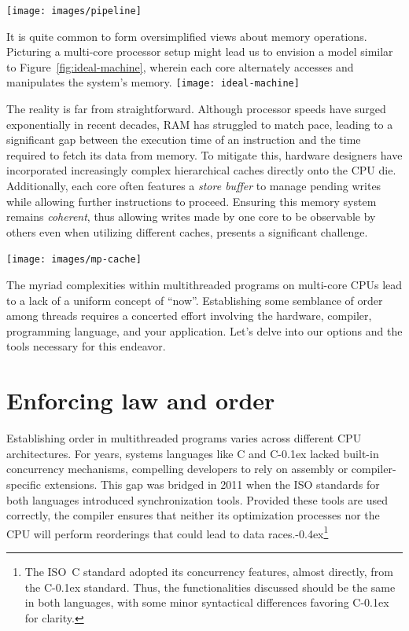 \documentclass[fontsize=10pt, oneside]{scrartcl}
\newcommand{\punckern}{\kern-0.4ex}
\newcommand{\cplusplus}[1]{C\kern-0.1ex\raisebox{0.15ex}{\texttt{++}}}
\newcommand{\clang}[1]{C}
\newcommand{\fig}[1]{Figure~\ref{#1}}
\newcommand{\introduce}[1]{\textit{#1}}
\begin{document}
\texttt{[image: images/pipeline]}
\label{fig:pipeline}

It is quite common to form oversimplified views about memory operations.
Picturing a multi-core processor setup might lead us to envision a model similar to \fig{fig:ideal-machine},
wherein each core alternately accesses and manipulates the system's memory.
\texttt{[image: ideal-machine]}
\label{fig:ideal-machine}

The reality is far from straightforward.
Although processor speeds have surged exponentially in recent decades,
\textsc{RAM} has struggled to match pace,
leading to a significant gap between the execution time of an instruction and the time required to fetch its data from memory.
To mitigate this, hardware designers have incorporated increasingly complex hierarchical caches directly onto the \textsc{CPU} die.
Additionally, each core often features a \introduce{store buffer} to manage pending writes while allowing further instructions to proceed.
Ensuring this memory system remains \introduce{coherent},
thus allowing writes made by one core to be observable by others even when utilizing different caches,
presents a significant challenge.

\texttt{[image: images/mp-cache]}
\label{fig:dunnington}

The myriad complexities within multithreaded programs on multi-core \textsc{CPU}s lead to a lack of a uniform concept of ``now''.
Establishing some semblance of order among threads requires a concerted effort involving the hardware,
compiler, programming language, and your application.
Let's delve into our options and the tools necessary for this endeavor.

\section{Enforcing law and order}
\label{seqcst}

Establishing order in multithreaded programs varies across different \textsc{CPU} architectures.
For years, systems languages like \clang{} and \cplusplus{} lacked built-in concurrency mechanisms,
compelling developers to rely on assembly or compiler-specific extensions.
This gap was bridged in 2011 when the \textsc{ISO} standards for both languages introduced synchronization tools.
Provided these tools are used correctly,
the compiler ensures that neither its optimization processes nor the \textsc{CPU} will perform reorderings that could lead to data races.\punckern\footnote{%
The ISO~\clang{11} standard adopted its concurrency features,
almost directly, from the \cplusplus{11} standard.
Thus, the functionalities discussed should be the same in both languages,
with some minor syntactical differences favoring \cplusplus{} for clarity.
}
\end{document}
